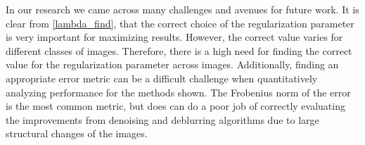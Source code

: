 \documentclass[10pt,a4paper]{article}
\begin{document}
In our research we came across many challenges and avenues for future work. It is clear from \ref{lambda_find}, that the correct choice of the regularization parameter is very important for maximizing results. However, the correct value varies for different classes of images. Therefore, there is a high need for finding the correct value for the regularization parameter across images. Additionally, finding an appropriate error metric can be a difficult challenge when quantitatively analyzing performance for the methods shown. The Frobenius norm of the error is the most common metric, but does can do a poor job of correctly evaluating the improvements from denoising and deblurring algorithms due to large structural changes of the images. 







\end{document}
